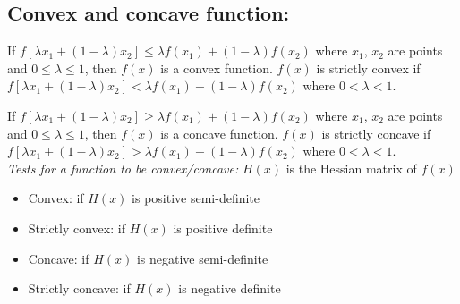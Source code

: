 \documentclass[../main-sheet.tex]{subfiles}
\begin{document}
\subsection{Convex and concave function:} If \(f[\lambda x_1+(1-\lambda) x_2]\leq \lambda f(x_1)+(1-\lambda) f(x_2)\) where \(x_1\), \(x_2\) are points and \(0\leq\lambda\leq1\), then \(f(x)\) is a convex function. \(f(x)\) is strictly convex if \(f[\lambda x_1+(1-\lambda) x_2]< \lambda f(x_1)+(1-\lambda) f(x_2)\) where \(0<\lambda<1\).
\begin{figure}[H]
    \centering
    \qquad
\end{figure}
If \(f[\lambda x_1+(1-\lambda) x_2]\geq \lambda f(x_1)+(1-\lambda) f(x_2)\) where \(x_1\), \(x_2\) are points and \(0\leq\lambda\leq1\), then \(f(x)\) is a concave function. \(f(x)\) is strictly concave if \(f[\lambda x_1+(1-\lambda) x_2]> \lambda f(x_1)+(1-\lambda) f(x_2)\) where \(0<\lambda<1\).\\
\emph{Tests for a function to be convex/concave:} \(H(x)\) is the Hessian matrix of \(f(x)\)
\begin{itemize}
    \item Convex: if \(H(x)\) is positive semi-definite
    \item Strictly convex: if \(H(x)\) is positive definite
    \item Concave: if \(H(x)\) is negative semi-definite
    \item Strictly concave: if \(H(x)\) is negative definite
\end{itemize}
\end{document}

